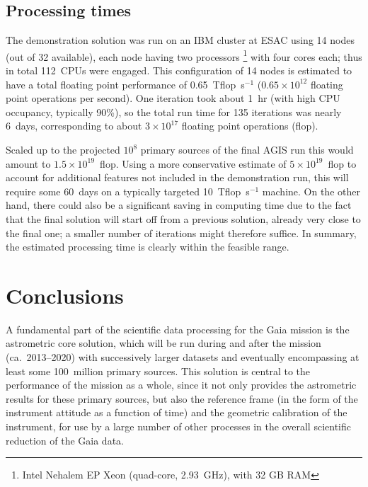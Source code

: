 \documentclass[structabstract]{aa}
\begin{document}
\subsection{Processing times}

The demonstration solution was run on an IBM cluster at ESAC using 14 nodes 
(out of 32 available), each node having two processors%
\footnote{Intel Nehalem EP Xeon (quad-core, 2.93~GHz), with 32 GB RAM} 
with four cores each; thus in total 112~CPUs were engaged. 
This configuration of 14 nodes is estimated to have a total floating 
point performance of 0.65~Tflop~s$^{-1}$ ($0.65\times 10^{12}$ floating 
point operations per second). 
One iteration took about 1~hr (with high CPU occupancy, typically
90\%), so the total run time for 135 iterations was nearly 6~days, 
corresponding to about $3\times 10^{17}$ floating point operations (flop).

Scaled up to the projected $10^8$ primary sources of the final AGIS run
this would amount to $1.5\times 10^{19}$~flop. Using a more conservative 
estimate of $5\times 10^{19}$~flop to account for additional features not 
included in the demonstration run, this will require some 60~days on
a typically targeted 10~Tflop~s$^{-1}$ machine. 
On the other hand, there could also be a significant saving in computing 
time due to the fact that the final solution will start off from a previous solution, 
already very close to the final one; a smaller number of iterations might therefore 
suffice. In summary, the estimated processing time is clearly within the feasible range.


\section{Conclusions}\label{sec:concl}

A fundamental part of the scientific data processing for the Gaia mission is the
astrometric core solution, which will be run during and after the mission
(ca.\ 2013--2020) with successively larger datasets and eventually encompassing
at least some 100~million primary sources. This solution is central to the
performance of the mission as a whole, since it not only provides the astrometric
results for these primary sources, but also the reference frame (in the form of
the instrument attitude as a function of time) and the geometric calibration of
the instrument, for use by a large number of other processes in the overall
scientific reduction of the Gaia data.
\end{document}
